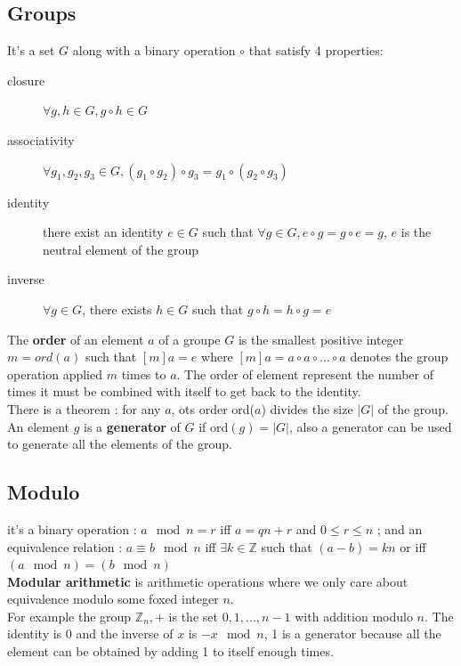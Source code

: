 \documentclass[11pt,a4paper]{report}
\begin{document}
\subsection{Groups}
It's a set $G$ along with a binary operation $\circ$ that satisfy 4 properties:
\begin{description}
\item[closure] $\forall g,h \in G, g \circ h \in G$
\item[associativity] $\forall g_1,g_2,g_3 \in G, (g_1 \circ g_2) \circ g_3 = g_1 \circ (g_2 \circ g_3)$
\item[identity] there exist an identity $e \in G$ such that $\forall g \in G, e \circ g = g \circ e = g$, $e$ is the neutral element of the group
\item[inverse] $\forall g \in G$, there exists $h \in G$ such that $g \circ h = h \circ g = e$
\end{description}

The \textbf{order} of an element $a$ of a groupe $G$ is the smallest positive integer $m = ord(a)$ such that $[m]a = e$ where $[m]a = a \circ a \circ ... \circ a$ denotes the group operation applied $m$ times to $a$. The order of element represent the number of times it must be combined with itself to get back to the identity.\\
There is a theorem : for any $a$, ots order ord($a$) divides the size $|G|$ of the group.\\
An element $g$ is a \textbf{generator} of $G$ if ord$(g) = |G|$, also a generator can be used to generate all the elements of the group.

\subsection{Modulo}
it's a binary operation : $a \mod n = r$ iff $a = qn + r$ and $0 \leq r \leq n$ ; and an equivalence relation : $a \equiv b \mod n$ iff $\exists k \in \mathbb{Z}$ such that $(a - b) = kn $ or iff $(a \mod n) = (b \mod n)$\\

\textbf{Modular arithmetic} is arithmetic operations where we only care about equivalence modulo some foxed integer $n$.\\
For example the group $\mathbb{Z}_n ,+$ is the set ${0,1,...,n-1}$ with addition modulo $n$. The identity is 0 and the inverse of $x$ is $-x \mod n$, 1 is a generator because all the element can be obtained by adding 1 to itself enough times.
\end{document}
